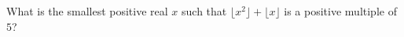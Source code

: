 What is the smallest positive real $x$ such that $\lfloor x^2\rfloor+\lfloor x\rfloor$ is a positive multiple of $5$?
